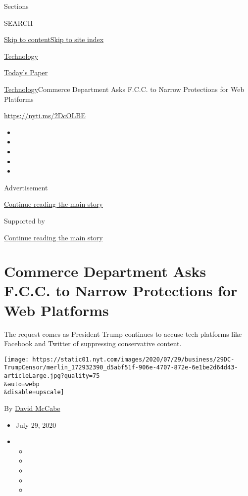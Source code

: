 Sections

SEARCH

\protect\hyperlink{site-content}{Skip to
content}\protect\hyperlink{site-index}{Skip to site index}

\href{https://www.nytimes.com/section/technology}{Technology}

\href{https://myaccount.nytimes.com/auth/login?response_type=cookie\&client_id=vi}{}

\href{https://www.nytimes.com/section/todayspaper}{Today's Paper}

\href{/section/technology}{Technology}\textbar{}Commerce Department Asks
F.C.C. to Narrow Protections for Web Platforms

\url{https://nyti.ms/2DcOLBE}

\begin{itemize}
\item
\item
\item
\item
\item
\end{itemize}

Advertisement

\protect\hyperlink{after-top}{Continue reading the main story}

Supported by

\protect\hyperlink{after-sponsor}{Continue reading the main story}

\hypertarget{commerce-department-asks-fcc-to-narrow-protections-for-web-platforms}{%
\section{Commerce Department Asks F.C.C. to Narrow Protections for Web
Platforms}\label{commerce-department-asks-fcc-to-narrow-protections-for-web-platforms}}

The request comes as President Trump continues to accuse tech platforms
like Facebook and Twitter of suppressing conservative content.

\texttt{[image: https://static01.nyt.com/images/2020/07/29/business/29DC-TrumpCensor/merlin\_172932390\_d5abf51f-906e-4707-872e-6e1be2d64d43-articleLarge.jpg?quality=75\\\&auto=webp\\\&disable=upscale]}

By \href{https://www.nytimes.com/by/david-mccabe}{David McCabe}

\begin{itemize}
\item
  July 29, 2020
\item
  \begin{itemize}
  \item
  \item
  \item
  \item
  \item
  \end{itemize}
\end{itemize}


